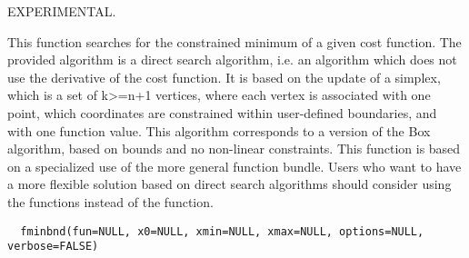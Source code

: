 %
\begin{Description}\relax

EXPERIMENTAL.

This function searches for the constrained minimum of a given cost function.
The provided algorithm is a direct search algorithm, i.e. an algorithm which
does not use the derivative of the cost function. It is based on the update of
a simplex, which is a set of k>=n+1 vertices, where each vertex is associated
with one point, which coordinates are constrained within user-defined 
boundaries, and with one function value. This algorithm corresponds to a 
version of the Box algorithm, based on bounds and no non-linear constraints. 
This function is based on a specialized use of the more general
 function bundle. Users who want to have a more flexible
solution based on direct search algorithms should consider using the
 functions instead of the  function.
\end{Description}
%
\begin{Usage}
\begin{verbatim}
  fminbnd(fun=NULL, x0=NULL, xmin=NULL, xmax=NULL, options=NULL, verbose=FALSE)
\end{verbatim}
\end{Usage}
%
